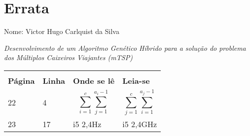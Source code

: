 \documentclass{abnt}
\begin{document}
	
	\chapter*{Errata}
	Nome: Victor Hugo Carlquist da Silva

	\textit{Desenvolvimento de um Algoritmo Genético Híbrido para a solução do problema dos Múltiplos Caixeiros Viajantes (\textit{mTSP})}
	\begin{table}[!ht]
	  \centering 
		\begin{tabular}{m{2cm} m{2cm} m{4cm} m{4cm}} \hline \\ 
		\textbf{Página} 	& \textbf{Linha} & \textbf{Onde se lê} & \textbf{Leia-se} \\ \hline
			22 		&   4   & $$\sum_{i=1}^{c} \sum_{j=1}^{a_i-1}$$ & $$\sum_{j=1}^{c} \sum_{i=1}^{a_j-1}$$ \\ \hline
			23		&   17  & i5 2,4Hz & i5 2,4GHz
		\end{tabular}
	\end{table}
\end{document}
